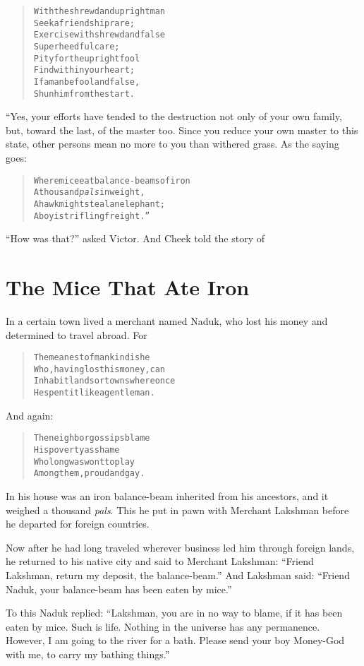 \documentclass[article, twoside, 14pt]{memoir}
\renewenvironment{verbatim}{%
\begin{quote}%
\vskip -10pt%
\begin{alltt}\normalfont\large}{\end{alltt}%
\end{quote}%
\vskip -10pt
} %
\begin{document}
\begin{verbatim}
With the shrewd and upright man
    Seek a friendship rare;
Exercise with shrewd and false
    Superheedful care;
Pity for the upright fool
    Find within your heart;
If a man be fool and false,
    Shun him from the start.
\end{verbatim}
“Yes, your efforts have tended to the destruction not only of your
own family, but, toward the last, of the master too. Since you
reduce your own master to this state, other persons mean no more to
you than withered grass. As the saying goes:

\begin{verbatim}
Where mice eat balance-beams of iron
    A thousand \emph{pals} in weight,
A hawk might steal an elephant;
    A boy is trifling freight.”
\end{verbatim}
``How was that?'' asked Victor. And Cheek told the story of

\chapter{The Mice That Ate Iron}

\label{s31}

In a certain town lived a merchant named Naduk, who lost his money
and determined to travel abroad. For

\begin{verbatim}
The meanest of mankind is he
    Who, having lost his money, can
Inhabit lands or towns where once
    He spent it like a gentleman.
\end{verbatim}
And again:

\begin{verbatim}
The neighbor gossips blame
His poverty as shame
Who long was wont to play
Among them, proud and gay.
\end{verbatim}
In his house was an iron balance-beam inherited from his ancestors,
and it weighed a thousand \emph{pals}. This he put in pawn with
Merchant Lakshman before he departed for foreign countries.

Now after he had long traveled wherever business led him through
foreign lands, he returned to his native city and said to Merchant
Lakshman: ``Friend Lakshman, return my deposit, the balance-beam.''
And Lakshman said:
``Friend Naduk, your balance-beam has been eaten by mice.''

To this Naduk replied:
``Lakshman, you are in no way to blame, if it has been eaten by mice. Such is life. Nothing in the universe has any permanence. However, I am going to the river for a bath. Please send your boy Money-God with me, to carry my bathing things.''
\end{document}
